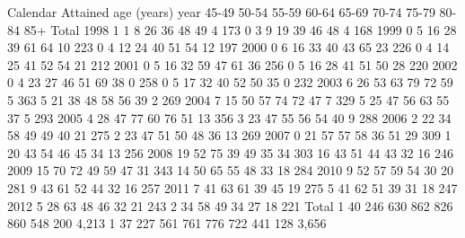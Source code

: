 {\smallskip}
Calendar  {\VBAR}                         Attained age (years)                        
year      {\VBAR} 45-49  50-54  55-59  60-64  65-69  70-74  75-79  80-84    85+  Total
     1998 {\VBAR}     1      1      8     26     36     48     49      4           173
          {\VBAR}     0      3      9     19     39     46     48      4           168
          {\VBAR} 
     1999 {\VBAR}     0      5     16     28     39     61     64     10           223
          {\VBAR}     0      4     12     24     40     51     54     12           197
          {\VBAR} 
     2000 {\VBAR}     0      6     16     33     40     43     65     23           226
          {\VBAR}     0      4     14     25     41     52     54     21           212
          {\VBAR} 
     2001 {\VBAR}     0      5     16     32     59     47     61     36           256
          {\VBAR}     0      5     16     28     41     51     50     28           220
          {\VBAR} 
     2002 {\VBAR}     0      4     23     27     46     51     69     38      0    258
          {\VBAR}     0      5     17     32     40     52     50     35      0    232
          {\VBAR} 
     2003 {\VBAR}            6     26     53     63     79     72     59      5    363
          {\VBAR}            5     21     38     48     58     56     39      2    269
          {\VBAR} 
     2004 {\VBAR}            7     15     50     57     74     72     47      7    329
          {\VBAR}            5     25     47     56     63     55     37      5    293
          {\VBAR} 
     2005 {\VBAR}            4     28     47     77     60     76     51     13    356
          {\VBAR}            3     23     47     55     56     54     40      9    288
          {\VBAR} 
     2006 {\VBAR}            2     22     34     58     49     49     40     21    275
          {\VBAR}            2     23     47     51     50     48     36     13    269
          {\VBAR} 
     2007 {\VBAR}            0     21     57     57     58     36     51     29    309
          {\VBAR}            1     20     43     54     46     45     34     13    256
          {\VBAR} 
     2008 {\VBAR}                  19     52     75     39     49     35     34    303
          {\VBAR}                  16     43     51     44     43     32     16    246
          {\VBAR} 
     2009 {\VBAR}                  15     70     72     49     59     47     31    343
          {\VBAR}                  14     50     65     55     48     33     18    284
          {\VBAR} 
     2010 {\VBAR}                   9     52     57     59     54     30     20    281
          {\VBAR}                   9     43     61     52     44     32     16    257
          {\VBAR} 
     2011 {\VBAR}                   7     41     63     61     39     45     19    275
          {\VBAR}                   5     41     62     51     39     31     18    247
          {\VBAR} 
     2012 {\VBAR}                   5     28     63     48     46     32     21    243
          {\VBAR}                   2     34     58     49     34     27     18    221
          {\VBAR} 
    Total {\VBAR}     1     40    246    630    862    826    860    548    200  4,213
          {\VBAR}     1     37    227    561    761    776    722    441    128  3,656

